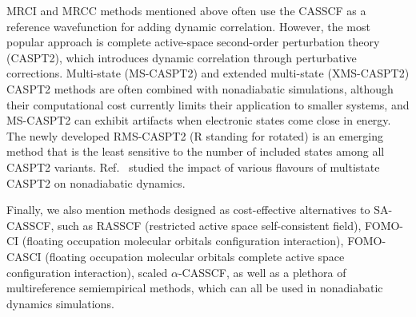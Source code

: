 \documentclass[9pt,bestpractices]{livecoms}
\begin{document}
MRCI and MRCC methods mentioned above often use the CASSCF as a reference wavefunction for adding dynamic correlation.\cite{lischka2018multireference} However, the most popular approach is complete active-space second-order perturbation theory (CASPT2), which introduces dynamic correlation through perturbative corrections. Multi-state (MS-CASPT2) and extended multi-state (XMS-CASPT2) CASPT2 methods are often combined with nonadiabatic simulations, although their computational cost currently limits their application to smaller systems,\cite{park2020multireference} and MS-CASPT2 can exhibit artifacts when electronic states come close in energy.\cite{shiozaki2013pyrazine} The newly developed RMS-CASPT2 (R standing for rotated)\cite{nishimoto2022analytic} is an emerging method that is the least sensitive to the number of included states among all CASPT2 variants.\cite{bezabih2023comparative} Ref.~ studied the impact of various flavours of multistate CASPT2 on nonadiabatic dynamics. 

Finally, we also mention methods designed as cost-effective alternatives to SA-CASSCF, such as RASSCF (restricted active space self-consistent field),\cite{malmqvist1990restricted} FOMO-CI (floating occupation molecular orbitals configuration interaction),\cite{granucci2000molecular,granucci2001direct} FOMO-CASCI (floating occupation molecular orbitals complete active space configuration interaction),\cite{slavicek2010fomocasci,hohenstein2015fomocasci,hollas2017nonadiabatic} scaled $\alpha$-CASSCF,\cite{snyder2017alpha,frutos_tracking_2007} as well as a plethora of multireference semiempirical methods,\cite{thiel2014semiempirical} which can all be used in nonadiabatic dynamics simulations.
\end{document}

